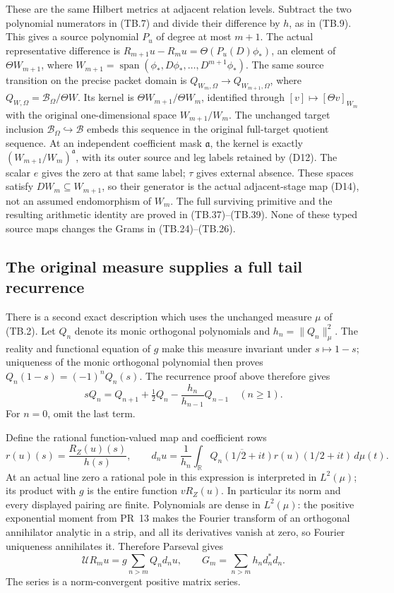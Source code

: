 These are the same Hilbert metrics at adjacent relation levels.
Subtract the two polynomial numerators in (TB.7) and divide
their difference by \(h\), as in (TB.9).  This gives a source
polynomial \(P_u\) of degree at most \(m+1\).
The actual representative difference is
\(R_{m+1}u-R_mu=\Theta(P_u(D)\phi_*)\), an element
of \(\Theta W_{m+1}\), where
\(W_{m+1}=\operatorname{span}(\phi_*,D\phi_*,\ldots,D^{m+1}\phi_*)\).
The same source transition on the precise packet domain is
\(Q_{W_m,\Omega}\to Q_{W_{m+1},\Omega}\), where
\(Q_{W,\Omega}=\mathscr B_\Omega/\Theta W\).
Its kernel is \(\Theta W_{m+1}/\Theta W_m\), identified through
\([v]\mapsto[\Theta v]_{W_m}\) with the original one-dimensional
space \(W_{m+1}/W_m\).  The unchanged target inclusion
\(\mathscr B_\Omega\hookrightarrow\mathscr B\) embeds this
sequence in the original full-target quotient sequence.
At an independent coefficient mask \(\mathfrak a\), the kernel
is exactly \((W_{m+1}/W_m)^{\mathfrak a}\), with its outer source
and leg labels retained by (D12).  The scalar \(e\) gives the
zero at that same label; \(\tau\) gives external absence.
These spaces satisfy \(DW_m\subseteq W_{m+1}\), so their
generator is the actual adjacent-stage map (D14), not an assumed
endomorphism of \(W_m\).  The full surviving primitive and the
resulting arithmetic identity are proved in (TB.37)--(TB.39).
None of these typed source maps changes the Grams in
(TB.24)--(TB.26).

\subsection{The original measure supplies a full tail recurrence}

There is a second exact description which uses the unchanged
measure \(\mu\) of (TB.2).  Let \(Q_n\) denote its monic orthogonal
polynomials and \(h_n=\|Q_n\|_\mu^2\).
The reality and functional equation of \(g\) make this measure
invariant under \(s\mapsto1-s\); uniqueness of the monic
orthogonal polynomial then proves
\(Q_n(1-s)=(-1)^nQ_n(s)\).
The recurrence proof above therefore gives
\[
 sQ_n=Q_{n+1}+\tfrac12Q_n-\frac{h_n}{h_{n-1}}Q_{n-1}
 \quad(n\geq1).
 \tag{TB.27}
\]
For \(n=0\), omit the last term.

Define the rational function-valued map and coefficient rows
\[
 r(u)(s)=\frac{R_Z(u)(s)}{h(s)},\qquad
 d_nu=\frac1{h_n}\int_{\mathbb R}
       \overline{Q_n(1/2+it)}r(u)(1/2+it)\,d\mu(t).
 \tag{TB.28}
\]
At an actual line zero a rational pole in this expression is
interpreted in \(L^2(\mu)\); its product with \(g\) is the entire
function \(vR_Z(u)\).  In particular its norm and every displayed
pairing are finite.  Polynomials are dense in \(L^2(\mu)\):
the positive exponential moment from PR~13 makes the Fourier
transform of an orthogonal annihilator analytic in a strip,
and all its derivatives vanish at zero, so Fourier uniqueness
annihilates it.  Therefore Parseval gives
\[
 \mathcal UR_mu=g\sum_{n>m}Q_nd_nu,\qquad
 \boxed{G_m=\sum_{n>m}h_nd_n^*d_n.}
 \tag{TB.29}
\]
The series is a norm-convergent positive matrix series.

